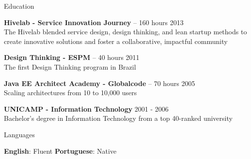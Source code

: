 \documentclass{resume} %
\begin{document}

\begin{rSection}{Education}

{\bf Hivelab - Service Innovation Journey} -- 160 hours \hfill 2013\\
The Hivelab blended service design, design thinking, and lean startup methods to create innovative solutions and foster a collaborative, impactful community 

{\bf Design Thinking - ESPM} -- 40 hours \hfill 2011\\
The first Design Thinking program in Brazil 

{\bf Java EE Architect Academy - Globalcode} -- 70 hours \hfill 2005\\
Scaling architectures from 10 to 10,000 users

{\bf UNICAMP - Information Technology} \hfill 2001 - 2006\\
Bachelor's degree in Information Technology from a top 40-ranked university

\end{rSection}

\begin{rSection}{Languages} 
\begin{itemize}
    \textbf{English}: Fluent \textbf{Portuguese}: Native
\end{itemize}
\end{rSection}
\hfill

\end{document}
